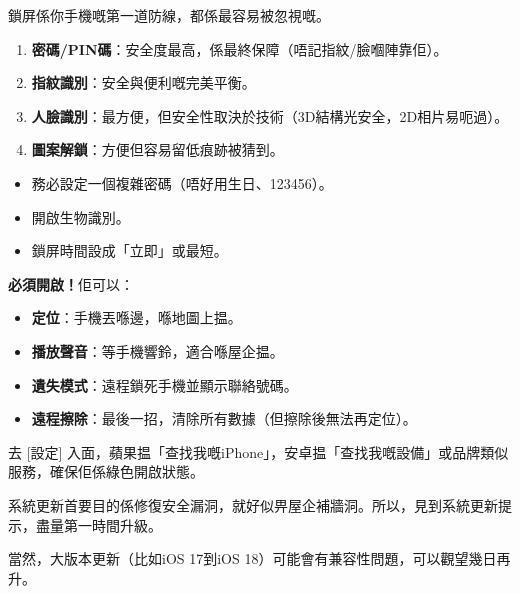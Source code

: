 


鎖屏係你手機嘅第一道防線，都係最容易被忽視嘅。


\begin{enumerate}
  \item \textbf{密碼/PIN碼}：安全度最高，係最終保障（唔記指紋/臉嗰陣靠佢）。
  \item \textbf{指紋識別}：安全與便利嘅完美平衡。
  \item \textbf{人臉識別}：最方便，但安全性取決於技術（3D結構光安全，2D相片易呃過）。
  \item \textbf{圖案解鎖}：方便但容易留低痕跡被猜到。
\end{enumerate}


\begin{itemize}
  \item 務必設定一個複雜密碼（唔好用生日、123456）。
  \item 開啟生物識別。
  \item 鎖屏時間設成「立即」或最短。
\end{itemize}


\textbf{必須開啟！}佢可以：

\begin{itemize}
  \item \textbf{定位}：手機丟喺邊，喺地圖上揾。
  \item \textbf{播放聲音}：等手機響鈴，適合喺屋企揾。
  \item \textbf{遺失模式}：遠程鎖死手機並顯示聯絡號碼。
  \item \textbf{遠程擦除}：最後一招，清除所有數據（但擦除後無法再定位）。
\end{itemize}

去 [設定] 入面，蘋果揾「查找我嘅iPhone」，安卓揾「查找我嘅設備」或品牌類似服務，確保佢係綠色開啟狀態。


系統更新首要目的係修復安全漏洞，就好似畀屋企補牆洞。所以，見到系統更新提示，盡量第一時間升級。

當然，大版本更新（比如iOS 17到iOS 18）可能會有兼容性問題，可以觀望幾日再升。

